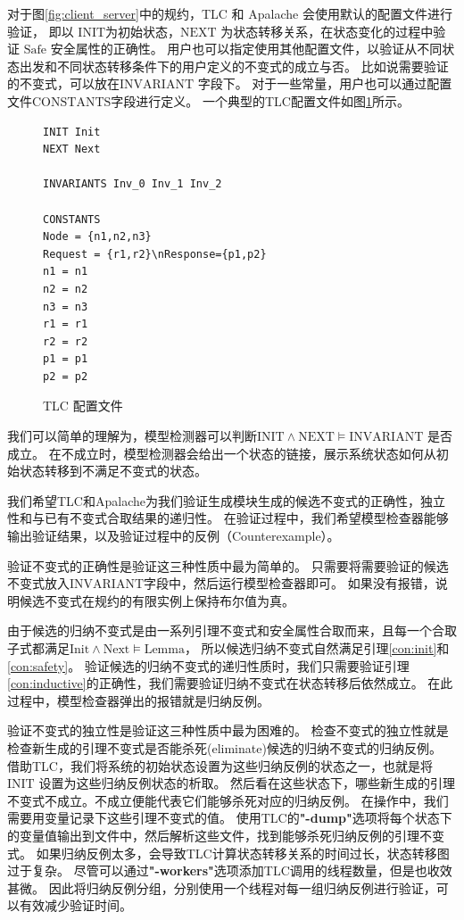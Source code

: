 对于图\ref{fig:client_server}中的规约，TLC 和 Apalache 会使用默认的配置文件进行验证，
即以 $\text{INIT}$为初始状态，$\text{NEXT}$ 为状态转移关系，在状态变化的过程中验证 $\text{Safe}$ 安全属性的正确性。
用户也可以指定使用其他配置文件，以验证从不同状态出发和不同状态转移条件下的用户定义的不变式的成立与否。
比如说需要验证的不变式，可以放在$\text{INVARIANT}$ 字段下。
对于一些常量，用户也可以通过配置文件$\text{CONSTANTS}$字段进行定义。
一个典型的TLC配置文件如图\ref{lst:tlc_cfg}所示。
\begin{figure}
	\centering
\begin{lstlisting}
INIT Init
NEXT Next

INVARIANTS Inv_0 Inv_1 Inv_2

CONSTANTS
Node = {n1,n2,n3}
Request = {r1,r2}\nResponse={p1,p2}
n1 = n1
n2 = n2
n3 = n3
r1 = r1
r2 = r2
p1 = p1
p2 = p2
\end{lstlisting}
\caption{TLC 配置文件}
\label{lst:tlc_cfg}	
\end{figure}
我们可以简单的理解为，模型检测器可以判断$\text{INIT} \wedge \text{NEXT} \vDash \text{INVARIANT}$ 是否成立。
在不成立时，模型检测器会给出一个状态的链接，展示系统状态如何从初始状态转移到不满足不变式的状态。

我们希望TLC和Apalache为我们验证生成模块生成的候选不变式的正确性，独立性和与已有不变式合取结果的递归性。
在验证过程中，我们希望模型检查器能够输出验证结果，以及验证过程中的反例（Counterexample）。

验证不变式的正确性是验证这三种性质中最为简单的。
只需要将需要验证的候选不变式放入$\text{INVARIANT}$字段中，然后运行模型检查器即可。
如果没有报错，说明候选不变式在规约的有限实例上保持布尔值为真。

由于候选的归纳不变式是由一系列引理不变式和安全属性合取而来，且每一个合取子式都满足$\text{Init} \wedge \text{Next} \vDash \text{Lemma}$，
所以候选归纳不变式自然满足引理\ref{con:init}和\ref{con:safety}。
验证候选的归纳不变式的递归性质时，我们只需要验证引理\ref{con:inductive}的正确性，我们需要验证归纳不变式在状态转移后依然成立。
在此过程中，模型检查器弹出的报错就是归纳反例。

验证不变式的独立性是验证这三种性质中最为困难的。
检查不变式的独立性就是检查新生成的引理不变式是否能杀死(eliminate)候选的归纳不变式的归纳反例。
借助TLC，我们将系统的初始状态设置为这些归纳反例的状态之一，也就是将$\text{INIT}$ 设置为这些归纳反例状态的析取。
然后看在这些状态下，哪些新生成的引理不变式不成立。不成立便能代表它们能够杀死对应的归纳反例。
在操作中，我们需要用变量记录下这些引理不变式的值。
使用TLC的\textbf{"-dump"}选项将每个状态下的变量值输出到文件中，然后解析这些文件，找到能够杀死归纳反例的引理不变式。
如果归纳反例太多，会导致TLC计算状态转移关系的时间过长，状态转移图过于复杂。
尽管可以通过\textbf{"-workers"}选项添加TLC调用的线程数量，但是也收效甚微。
因此将归纳反例分组，分别使用一个线程对每一组归纳反例进行验证，可以有效减少验证时间。

